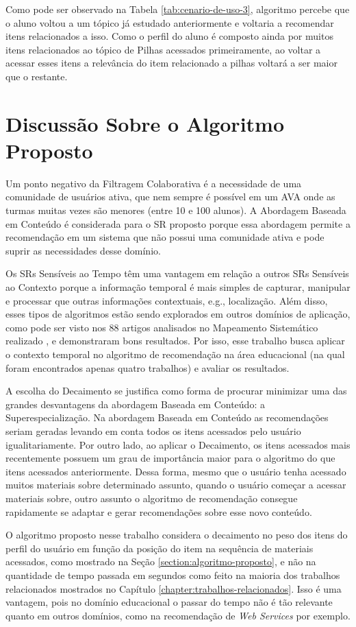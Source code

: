 Como pode ser observado na Tabela \ref{tab:cenario-de-uso-3}, algoritmo percebe que o aluno voltou a um tópico já
estudado anteriormente e voltaria a recomendar itens relacionados a isso. Como o perfil do aluno é composto ainda por
muitos itens relacionados ao tópico de Pilhas acessados primeiramente, ao voltar a acessar esses itens a relevância do item
relacionado a pilhas voltará a ser maior que o restante.

\section{Discussão Sobre o Algoritmo Proposto}

Um ponto negativo da Filtragem Colaborativa é a necessidade de uma comunidade de usuários ativa, que nem sempre é
possível em um AVA onde as turmas muitas vezes são menores (entre 10 e 100 alunos). A Abordagem Baseada
em Conteúdo é considerada para o SR proposto porque essa abordagem permite a recomendação em um sistema que não possui uma
comunidade ativa e pode suprir as necessidades desse domínio.

Os SRs Sensíveis ao Tempo têm uma vantagem em relação a outros SRs Sensíveis ao Contexto porque a informação temporal é
mais simples de capturar, manipular e processar que outras informações contextuais, e.g., localização. Além disso, esses tipos de
algoritmos estão sendo explorados em outros domínios de aplicação, como pode ser visto nos 88 artigos analisados no
Mapeamento Sistemático realizado \cite{de2017time}, e demonstraram bons resultados. Por isso, esse trabalho busca
aplicar o contexto temporal no algoritmo de recomendação na área educacional (na qual foram encontrados apenas quatro
trabalhos) e avaliar os resultados.

A escolha do Decaimento se justifica como forma de procurar minimizar uma das grandes desvantagens da abordagem Baseada em Conteúdo: a
Superespecialização. Na abordagem Baseada em Conteúdo as recomendações seriam geradas levando em conta todos os itens
acessados pelo usuário igualitariamente. Por outro lado, ao aplicar o Decaimento, os itens acessados mais recentemente possuem um
grau de importância maior para o algoritmo do que itens acessados anteriormente. Dessa forma, mesmo que o usuário
tenha acessado muitos materiais sobre determinado assunto, quando o usuário começar a acessar materiais sobre, outro assunto o algoritmo de
recomendação consegue rapidamente se adaptar e gerar recomendações sobre esse novo conteúdo.

O algoritmo proposto nesse trabalho considera o decaimento no peso dos itens do perfil do usuário em função da posição
do item na sequência de materiais acessados, como mostrado na Seção \ref{section:algoritmo-proposto}, e não na quantidade de tempo passada em
segundos como feito na maioria dos trabalhos relacionados mostrados no Capítulo \ref{chapter:trabalhos-relacionados}. Isso é uma vantagem, pois no domínio
educacional o passar do tempo não é tão relevante quanto em outros domínios, como na recomendação de \textit{Web Services} por
exemplo.


